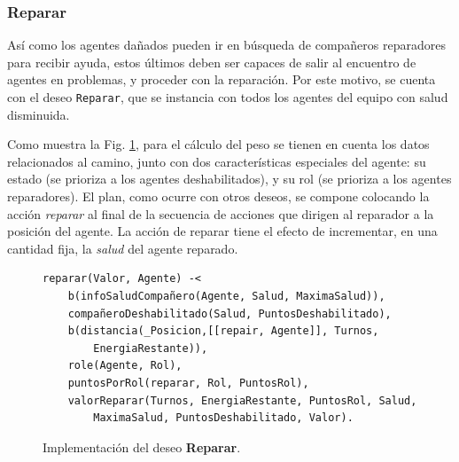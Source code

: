 \documentclass[oneside]{book}
\theoremstyle{definition}
\begin{document}
\subsubsection{Reparar}

Así como los agentes dañados pueden ir en búsqueda de compañeros reparadores para recibir ayuda,
estos últimos deben ser capaces de salir al encuentro de agentes en problemas, y proceder con la 
reparación. Por este motivo, se cuenta con el deseo \texttt{Reparar}, que se instancia con todos 
los agentes del equipo con salud disminuida.

Como muestra la Fig. \ref{fig:deseoReparar}, para el cálculo del peso se tienen en cuenta los datos
relacionados al camino, junto con dos características especiales del agente: su estado (se prioriza 
a los agentes deshabilitados), y su rol (se prioriza a los agentes reparadores). El plan, como 
ocurre con otros deseos, se compone colocando la acción \textit{reparar} al final de la secuencia 
de acciones que dirigen al reparador a la posición del agente. La acción de reparar tiene el efecto 
de incrementar, en una cantidad fija, la \textit{salud} del agente reparado. 

\begin{figure}
\begin{verbatim}
reparar(Valor, Agente) -<
	b(infoSaludCompañero(Agente, Salud, MaximaSalud)),
	compañeroDeshabilitado(Salud, PuntosDeshabilitado),
    b(distancia(_Posicion,[[repair, Agente]], Turnos, 
    	EnergiaRestante)),
    role(Agente, Rol),
	puntosPorRol(reparar, Rol, PuntosRol),
    valorReparar(Turnos, EnergiaRestante, PuntosRol, Salud, 
	    MaximaSalud, PuntosDeshabilitado, Valor).
\end{verbatim}
\caption{Implementación del deseo \textbf{Reparar}.}
\label{fig:deseoReparar}
\end{figure}

    
 
 


%
%


\end{document}
